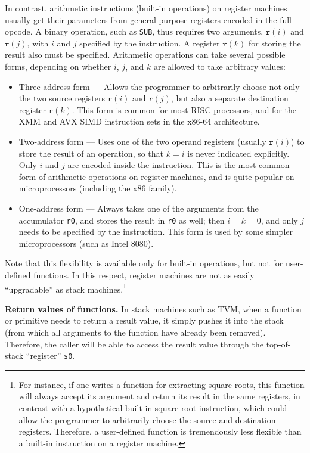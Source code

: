 \documentclass[12pt,oneside]{article}
\def\makepoint#1{\medbreak\noindent{\bf #1.\ }}
\def\nxsubpoint{\refstepcounter{subsubsection}%
    \smallbreak\makepoint{\thesubsubsection}}
\def\emb#1{\textbf{#1.}}
\begin{document}
    In contrast, arithmetic instructions (built-in operations) on register machines usually get their parameters from general-purpose registers encoded in the full opcode. A binary operation, such as \texttt{SUB}, thus requires two arguments, $\texttt{r}(i)$ and $\texttt{r}(j)$, with $i$ and $j$ specified by the instruction. A register $\texttt{r}(k)$ for storing the result also must be specified. Arithmetic operations can take several possible forms, depending on whether $i$, $j$, and $k$ are allowed to take arbitrary values:
    \begin{itemize}
        \item {Three-address form} --- Allows the programmer to arbitrarily choose not only the two source registers $\texttt{r}(i)$ and $\texttt{r}(j)$, but also a separate destination register $\texttt{r}(k)$. This form is common for most RISC processors, and for the XMM and AVX SIMD instruction sets in the x86-64 architecture.
        \item {Two-address form} --- Uses one of the two operand registers (usually $\texttt{r}(i)$) to store the result of an operation, so that $k=i$ is never indicated explicitly. Only $i$ and $j$ are encoded inside the instruction. This is the most common form of arithmetic operations on register machines, and is quite popular on microprocessors (including the x86 family).
        \item {One-address form} --- Always takes one of the arguments from the accumulator \texttt{r0}, and stores the result in \texttt{r0} as well; then $i=k=0$, and only $j$ needs to be specified by the instruction. This form is used by some simpler microprocessors (such as Intel 8080).
    \end{itemize}

    Note that this flexibility is available only for built-in operations, but not for user-defined functions. In this respect, register machines are not as easily ``upgradable'' as stack machines.\footnote{For instance, if one writes a function for extracting square roots, this function will always accept its argument and return its result in the same registers, in contrast with a hypothetical built-in square root instruction, which could allow the programmer to arbitrarily choose the source and destination registers. Therefore, a user-defined function is tremendously less flexible than a built-in instruction on a register machine.}

    \nxsubpoint\emb{Return values of functions}
    In stack machines such as TVM, when a function or primitive needs to return a result value, it simply pushes it into the stack (from which all arguments to the function have already been removed). Therefore, the caller will be able to access the result value through the top-of-stack ``register'' \texttt{s0}.
\end{document}
